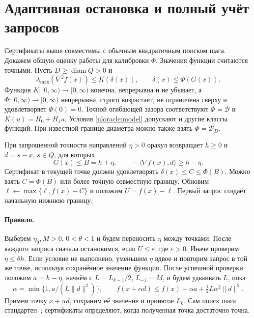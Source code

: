 \section{Адаптивная остановка и полный учёт запросов}
\label{nloracle:section}
Сертификаты выше совместимы с обычным квадратичным поиском шага.
Докажем общую оценку работы для калибровки $\Phi$.
Значения функции считаются точными.
Пусть $D\ge\operatorname{diam}Q>0$ и
\begin{equation}\label{nloracle:model}
 \lambda_{\max}(\nabla^2f(x))\le K(\delta(x)),\qquad
 \delta(x)\le\Phi(G(x)).
\end{equation}
Функция $K:[0,\infty)\to[0,\infty)$ конечна, непрерывна и не убывает,
а $\Phi:[0,\infty)\to[0,\infty)$ непрерывна, строго возрастает,
не ограничена сверху и удовлетворяет $\Phi(0)=0$.
Точной огибающей зазора соответствуют $\Phi=\mathcal B$ и
$K(u)=H_0+H_1u$. Условия \eqref{nloracle:model} допускают
и другие классы функций.
При известной границе диаметра можно также взять $\Phi=\mathcal B_D$.

При запрошенной точности направлений $\eta>0$ оракул возвращает
$h\ge0$ и $d=s-x$, $s\in Q$, для которых
\begin{equation}\label{nloracle:query}
 G(x)\le B=h+\eta,\qquad
 -\langle\nabla f(x),d\rangle\ge h-\eta.
\end{equation}
Сертификат в текущей точке должен удовлетворять
$\delta(x)\le C\le\Phi(B)$. Можно взять $C=\Phi(B)$
или более точную совместную границу.
Обновим $\ell\leftarrow\max\{\ell,f(x)-C\}$ и положим $U=f(x)-\ell$.
Первый запрос создаёт начальную нижнюю границу.

\paragraph{Правило.}
Выберем $\eta_0,M>0$, $0<\theta<1$ и будем переносить $\eta$
между точками. После каждого запроса сначала остановимся, если
$U\le\varepsilon$, где $\varepsilon>0$.
Иначе проверим $\eta\le\theta h$. Если условие не выполнено,
уменьшим $\eta$ вдвое и повторим запрос в той же точке,
используя сохранённое значение функции.
После успешной проверки положим $a=h-\eta$,
начнём с $L=L_{k-1}/2$, $L_{-1}=M$, и будем удваивать $L$, пока
\begin{equation}\label{eq:btstep}
 \alpha=\min\{1,a/(L\|d\|^2)\},\qquad
 f(x+\alpha d)\le f(x)-\alpha a+\tfrac12L\alpha^2\|d\|^2.
\end{equation}
Примем точку $x+\alpha d$, сохраним её значение и принятое $L_k$.
Сам поиск шага стандартен~\cite{pedregosa}; сертификаты определяют,
когда полученная точка достаточно точна.

